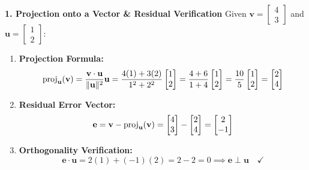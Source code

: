 \textbf{1. Projection onto a Vector \& Residual Verification}
Given $\mathbf{v} = \begin{bmatrix} 4 \\ 3 \end{bmatrix}$ and $\mathbf{u} = \begin{bmatrix} 1 \\ 2 \end{bmatrix}$:
\begin{enumerate}
    \item \textbf{Projection Formula:}
    \begin{equation*}
    \operatorname{proj}_{\mathbf{u}}(\mathbf{v}) = \frac{\mathbf{v} \cdot \mathbf{u}}{\|\mathbf{u}\|^2} \mathbf{u} = \frac{4(1) + 3(2)}{1^2 + 2^2} \begin{bmatrix} 1 \\ 2 \end{bmatrix} = \frac{4 + 6}{1 + 4} \begin{bmatrix} 1 \\ 2 \end{bmatrix} = \frac{10}{5} \begin{bmatrix} 1 \\ 2 \end{bmatrix} = \mathbf{\begin{bmatrix} 2 \\ 4 \end{bmatrix}}
    \end{equation*}
    \item \textbf{Residual Error Vector:}
    \begin{equation*}
    \mathbf{e} = \mathbf{v} - \operatorname{proj}_{\mathbf{u}}(\mathbf{v}) = \begin{bmatrix} 4 \\ 3 \end{bmatrix} - \begin{bmatrix} 2 \\ 4 \end{bmatrix} = \begin{bmatrix} 2 \\ -1 \end{bmatrix}
    \end{equation*}
    \item \textbf{Orthogonality Verification:}
    \begin{equation*}
    \mathbf{e} \cdot \mathbf{u} = 2(1) + (-1)(2) = 2 - 2 = 0 \implies \mathbf{e} \perp \mathbf{u} \quad \checkmark
    \end{equation*}
\end{enumerate}

